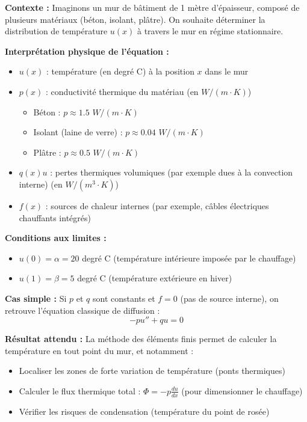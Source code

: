 \documentclass[11pt,a4paper]{report}
\begin{document}
\begin{exempleBox}
\textbf{Contexte :} Imaginons un mur de bâtiment de 1 mètre d'épaisseur, composé de plusieurs matériaux (béton, isolant, plâtre). On souhaite déterminer la distribution de température $u(x)$ à travers le mur en régime stationnaire.

\vspace{0.3cm}

\textbf{Interprétation physique de l'équation :}

\begin{itemize}
    \item \textbf{$u(x)$} : température (en degré C) à la position $x$ dans le mur
    \item \textbf{$p(x)$} : conductivité thermique du matériau (en $W/(m \cdot K)$)
    \begin{itemize}
        \item Béton : $p \approx 1.5$ $W/(m \cdot K)$
        \item Isolant (laine de verre) : $p \approx 0.04$ $W/(m \cdot K)$
        \item Plâtre : $p \approx 0.5$ $W/(m \cdot K)$
    \end{itemize}
    \item \textbf{$q(x) u$} : pertes thermiques volumiques (par exemple dues à la convection interne) (en $W/(m^3 \cdot K)$)
    \item \textbf{$f(x)$} : sources de chaleur internes (par exemple, câbles électriques chauffants intégrés)
\end{itemize}

\vspace{0.3cm}


\textbf{Conditions aux limites :}
\begin{itemize}
    \item $u(0) = \alpha = 20$ degré C (température intérieure imposée par le chauffage)
    \item $u(1) = \beta = 5$ degré C (température extérieure en hiver)
\end{itemize}

\vspace{0.3cm}

\textbf{Cas simple :} Si $p$ et $q$ sont constants et $f = 0$ (pas de source interne), on retrouve l'équation classique de diffusion :
\[
-p u'' + q u = 0
\]

\textbf{Résultat attendu :} La méthode des éléments finis permet de calculer la température en tout point du mur, et notamment :
\begin{itemize}
    \item Localiser les zones de forte variation de température (ponts thermiques)
    \item Calculer le flux thermique total : $\Phi = -p \frac{du}{dx}$ (pour dimensionner le chauffage)
    \item Vérifier les risques de condensation (température du point de rosée)
\end{itemize}
\end{exempleBox}
\end{document}
